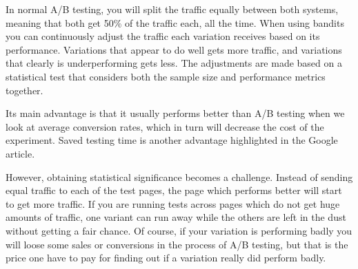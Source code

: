 In normal A/B testing, you will split the traffic equally between both systems,
meaning that both get 50\% of the traffic each, all the time. When using
bandits you can continuously adjust the traffic each variation receives based
on its performance. Variations that appear to do well gets more traffic, and
variations that clearly is underperforming gets less. The adjustments are made
based on a statistical test that considers both the sample size and performance
metrics together.

Its main advantage is that it usually performs better than A/B testing when we
look at average conversion rates, which in turn will decrease the cost of the
experiment.  Saved testing time is another advantage highlighted in the Google
article.

However, obtaining statistical significance becomes a challenge. Instead of
sending equal traffic to each of the test pages, the page which performs better
will start to get more traffic. If you are running tests across pages which do
not get huge amounts of traffic, one variant can run away while the others are
left in the dust without getting a fair chance. Of course, if your variation is
performing badly you will loose some sales or conversions in the process of A/B
testing, but that is the price one have to pay for finding out if a variation
really did perform badly.
